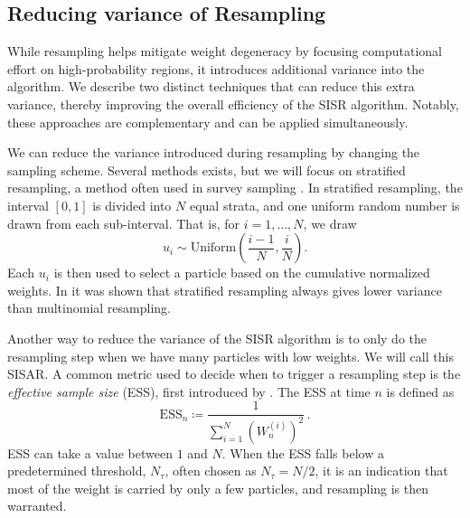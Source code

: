 \subsection{Reducing variance of Resampling}
While resampling helps mitigate weight degeneracy by focusing computational effort on high-probability regions, it introduces additional variance into the algorithm. We describe two distinct techniques that can reduce this extra variance, thereby improving the overall efficiency of the \gls*{SISR} algorithm. Notably, these approaches are complementary and can be applied simultaneously.

We can reduce the variance introduced during resampling by changing the sampling scheme. Several methods exists, but we will focus on stratified resampling, a method often used in survey sampling \cite{kiderlen2022survey}. In stratified resampling, the interval $[0,1]$ is divided into $N$ equal strata, and one uniform random number is drawn from each sub-interval. That is, for $i=1,\dots,N$, we draw 
\[
u_i \sim \text{Uniform}\left(\frac{i-1}{N}, \frac{i}{N}\right).
\]
Each $u_i$ is then used to select a particle based on the cumulative normalized weights. In \cite{douc2005comparisonresamplingschemesparticle} it was shown that stratified resampling always gives lower variance than multinomial resampling. 


Another way to reduce the variance of the \gls*{SISR} algorithm is to only do the resampling step when we have many particles with low weights. We will call this \gls*{SISAR}.
A common metric used to decide when to trigger a resampling step is the \emph{effective sample size} (ESS), first introduced by \cite{Liu}. The ESS at time $n$ is defined as
\[
\text{ESS}_n \coloneq \frac{1}{\sum_{i=1}^N \left(W_n^{(i)}\right)^2}\,.
\]
ESS can take a value between $1$ and $N$. When the ESS falls below a predetermined threshold, $N_\tau$, often chosen as $N_\tau=N/2$, it is an indication that most of the weight is carried by only a few particles, and resampling is then warranted.

